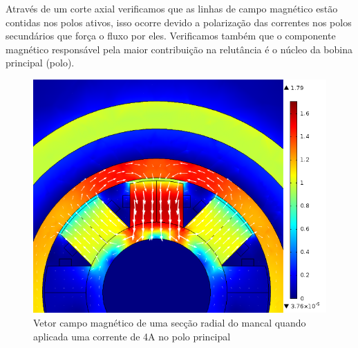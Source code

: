 Através de um corte axial verificamos que as linhas de campo magnético estão contidas nos polos ativos, isso ocorre devido a polarização das correntes nos polos secundários que força o fluxo por eles. Verificamos também que o componente magnético responsável pela maior contribuição na relutância é o núcleo da bobina principal (polo).

\begin{figure}
\centering
\includegraphics[width=0.8\linewidth]{Figs/Simulacoes/Ativo/Cima_dx=03_I=4}
\caption{Vetor campo magnético de uma secção radial do mancal quando aplicada uma corrente de 4A no polo principal}
\label{fig:ativo:fem:b:radial}
\end{figure}




